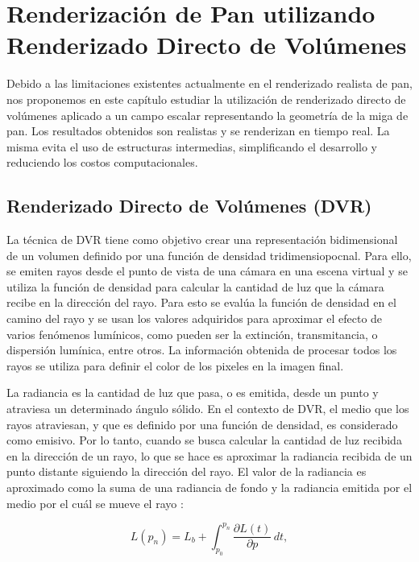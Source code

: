 
\chapter[Renderización de Pan utilizando DVR]{Renderización de Pan utilizando Renderizado Directo de Volúmenes}
Debido a las limitaciones existentes actualmente en el renderizado realista de pan, nos proponemos en este capítulo estudiar la utilización de renderizado directo de volúmenes aplicado a un campo escalar representando la geometría de la miga de pan. Los resultados obtenidos son realistas y se renderizan en tiempo real. La misma evita el uso de estructuras intermedias, simplificando el desarrollo y reduciendo los costos computacionales.

\section{Renderizado Directo de Volúmenes (DVR)}
La técnica de DVR tiene como objetivo crear una representación bidimensional de un volumen
definido por una función de densidad tridimensiopocnal. Para ello, se emiten rayos desde el punto de vista de una cámara en una escena virtual y se utiliza la función de densidad para calcular la cantidad de luz que la cámara recibe en la dirección del rayo. Para esto se evalúa la función de densidad en el camino del rayo y se usan los valores adquiridos para aproximar el efecto de varios fenómenos lumínicos, como pueden ser la extinción, transmitancia, o dispersión lumínica, entre otros. La información obtenida de procesar todos los rayos se utiliza para definir el color de los pixeles en la imagen final.

La radiancia es la cantidad de luz que pasa, o es emitida, desde un punto y atraviesa un determinado ángulo sólido. En el contexto de DVR, el medio que los rayos atraviesan, y que es definido por una función de densidad, es considerado como emisivo. Por lo tanto, cuando se busca calcular la cantidad de luz recibida en la dirección de un rayo, lo que se hace es aproximar la radiancia recibida de un punto distante siguiendo la dirección del rayo. El valor de la radiancia es aproximado como la suma de una radiancia de fondo y la radiancia emitida por el medio por el cuál se mueve el rayo \cite{Kratz2006} :

\begin{equation} \label{eq:general_radiance}  
  L(p_n) = L_b + \int_{p_0}^{p_n} \frac{\partial L(t)}{\partial p} \, dt,
\end{equation}

